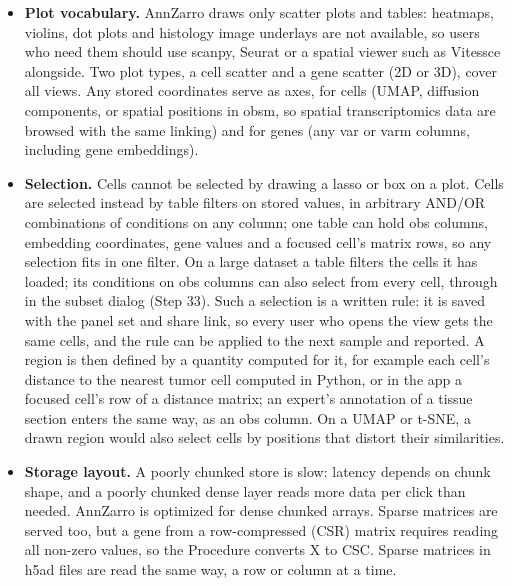 \begin{itemize}
\tightlist
\item
  \textbf{Plot vocabulary.} AnnZarro draws only scatter plots and tables: heatmaps, violins, dot plots and histology image underlays are not available, so users who need them should use scanpy, Seurat or a spatial viewer such as Vitessce alongside. Two plot types, a cell scatter and a gene scatter (2D or 3D), cover all views. Any stored coordinates serve as axes, for cells (UMAP, diffusion components, or spatial positions in obsm, so spatial transcriptomics data are browsed with the same linking) and for genes (any var or varm columns, including gene embeddings).
\item
  \textbf{Selection.} Cells cannot be selected by drawing a lasso or box on a plot. Cells are selected instead by table filters on stored values, in arbitrary AND/OR combinations of conditions on any column; one table can hold obs columns, embedding coordinates, gene values and a focused cell's matrix rows, so any selection fits in one filter. On a large dataset a table filters the cells it has loaded; its conditions on obs columns can also select from every cell, through  in the subset dialog (Step 33). Such a selection is a written rule: it is saved with the panel set and share link, so every user who opens the view gets the same cells, and the rule can be applied to the next sample and reported. A region is then defined by a quantity computed for it, for example each cell's distance to the nearest tumor cell computed in Python, or in the app a focused cell's row of a distance matrix; an expert's annotation of a tissue section enters the same way, as an obs column. On a UMAP or t-SNE, a drawn region would also select cells by positions that distort their similarities\cite{chari2023}.
\item
  \textbf{Storage layout.} A poorly chunked store is slow: latency depends on chunk shape, and a poorly chunked dense layer reads more data per click than needed. AnnZarro is optimized for dense chunked arrays. Sparse matrices are served too, but a gene from a row-compressed (CSR) matrix requires reading all non-zero values, so the Procedure converts X to CSC. Sparse matrices in h5ad files are read the same way, a row or column at a time.

\end{itemize}
